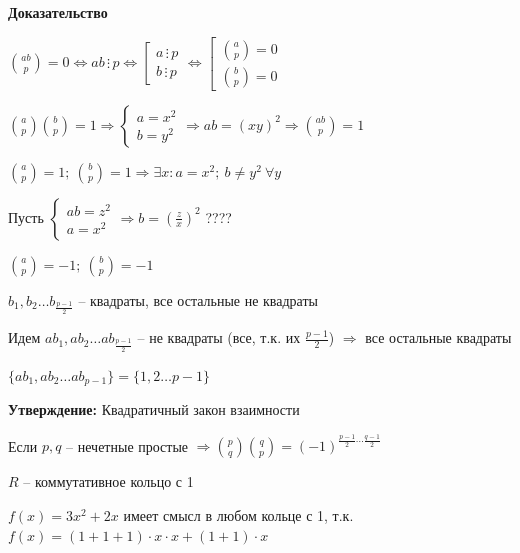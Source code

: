 \documentclass[14pt, letter paper]{article}
\begin{document}
\begin{enumerate}
    \begin{center}
        \textbf{Доказательство}
    \end{center}

    ${ab \choose p} = 0 \Leftrightarrow ab \, \vdots \, p \Leftrightarrow \left[ \begin{gathered}
        a \, \vdots \, p \\
        b \, \vdots \, p
    \end{gathered} \right. \Leftrightarrow \left[ \begin{gathered}
        {a \choose p} = 0 \\
        {b \choose p} = 0
    \end{gathered} \right.$

    ${a \choose p}{b \choose p} = 1 \Rightarrow \begin{cases}
        a = x^2 \\
        b = y^2
    \end{cases} \Rightarrow ab = (xy)^2 \Rightarrow {ab \choose p} = 1$

    ${a \choose p} = 1;\ {b \choose p} = 1 \Rightarrow \exists x : a = x^2;\ b \neq y^2\ \forall y$

    Пусть $\begin{cases}
        ab = z^2 \\
        a = x^2
    \end{cases} \Rightarrow b = (\frac{z}{x})^2$ ????

    ${a \choose p} = -1;\ {b \choose p} = -1$

    $b_1, b_2 \ldots b_\frac{p-1}{2}$ -- квадраты, все остальные не квадраты

    Идем $ab_1, ab_2 \ldots ab_\frac{p-1}{2}$ -- не квадраты (все, т.к. их $\frac{p-1}{2}$) $\Rightarrow$ все остальные квадраты

    $\{ab_1, ab_2 \ldots ab_{p-1}\} = \{1, 2 \ldots p-1\}$

    \textbf{Утверждение:} Квадратичный закон взаимности

    Если $p, q$ -- нечетные простые $\Rightarrow {p \choose q}{q \choose p} = (-1)^{\frac{p-1}{2} \cdots \frac{q-1}{2}}$
\end{enumerate}

\vspace{5mm}

$R$ -- коммутативное кольцо с 1

$f(x) = 3x^2 + 2x$ имеет смысл в любом кольце с 1, т.к. $f(x) = (1 + 1 + 1) \cdot x \cdot x + (1 + 1) \cdot x$
\end{document}
